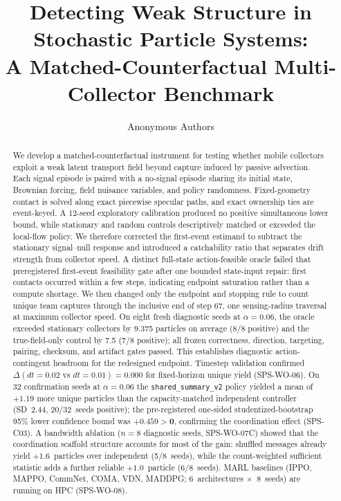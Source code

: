 \documentclass{article}
\title{Detecting Weak Structure in Stochastic Particle Systems:\\
A Matched-Counterfactual Multi-Collector Benchmark}
\author{Anonymous Authors}
\date{}
\begin{document}
\maketitle

\begin{abstract}
We develop a matched-counterfactual instrument for testing whether mobile
collectors exploit a weak latent transport field beyond capture induced by
passive advection. Each signal episode is paired with a no-signal episode
sharing its initial state, Brownian forcing, field nuisance variables, and
policy randomness. Fixed-geometry contact is solved along exact piecewise
specular paths, and exact ownership ties are event-keyed. A 12-seed exploratory
calibration produced no positive simultaneous lower bound, while stationary
and random controls descriptively matched or exceeded the local-flow policy.
We therefore corrected the first-event estimand to subtract the stationary
signal--null response and introduced a catchability ratio that separates drift
strength from collector speed. A distinct full-state action-feasible oracle
failed that preregistered first-event feasibility gate after one bounded
state-input repair: first contacts occurred within a few steps, indicating
endpoint saturation rather than a compute shortage. We then changed only the
endpoint and stopping rule to count unique team captures through the inclusive
end of step 67, one sensing-radius traversal at maximum collector speed. On
eight fresh diagnostic seeds at \(\alpha=0.06\), the oracle exceeded stationary
collectors by 9.375 particles on average (8/8 positive) and the true-field-only
control by 7.5 (7/8 positive); all frozen correctness, direction, targeting,
pairing, checksum, and artifact gates passed. This establishes diagnostic
action-contingent headroom for the redesigned endpoint.
Timestep validation confirmed $\Delta(dt{=}0.02\text{ vs }dt{=}0.01)=0.000$ for
fixed-horizon unique yield (SPS-WO-06). On 32 confirmation seeds at $\alpha=0.06$
the \texttt{shared\_summary\_v2} policy yielded a mean of $+1.19$ more unique
particles than the capacity-matched independent controller (SD~2.44, 20/32~seeds
positive); the pre-registered one-sided studentized-bootstrap 95\% lower confidence
bound was $\mathbf{+0.459>0}$, confirming the coordination effect (SPS-C03).
A bandwidth ablation ($n=8$ diagnostic seeds, SPS-WO-07C) showed that the
coordination scaffold structure accounts for most of the gain: shuffled messages
already yield $+1.6$~particles over independent (5/8~seeds), while the
count-weighted sufficient statistic adds a further reliable $+1.0$~particle
(6/8~seeds). MARL baselines (IPPO, MAPPO, CommNet, COMA, VDN, MADDPG;
6~architectures $\times$~8~seeds) are running on HPC (SPS-WO-08).
\end{abstract}
\end{document}
